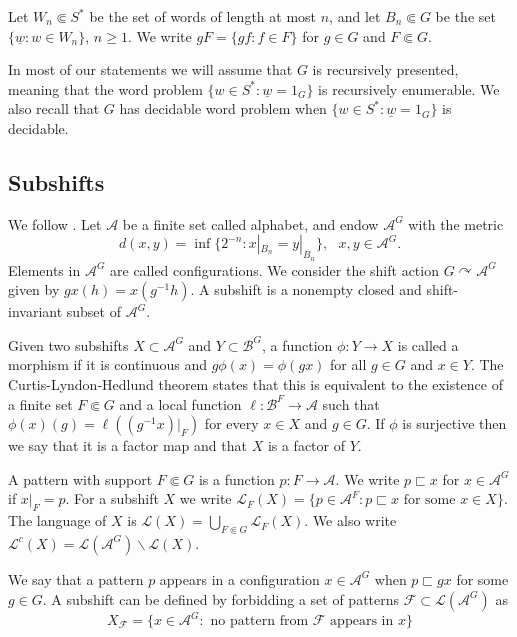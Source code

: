 \documentclass[a4paper,oneside]{amsart}
\renewcommand{\(}{\begin{dmath*}}
\renewcommand{\)}{\end{dmath*}}
\theoremstyle{definition}
\newcommand{\Le}{\mathcal{L}}
\newcommand{\A}{\mathcal{A}}
\newcommand{\B}{\mathcal{B}}
\begin{document}
Let $W_n\Subset S^\ast$ be the set of words of length at most $n$, and let $B_n\Subset G$ be the set $\{\underline{w} : w\in W_n\}$, $n\geq 1$. We write $gF=\{gf : f\in F\}$ for $g\in G$ and $F\Subset G$.

In most of our statements we will assume that $G$ is recursively presented, meaning that the word problem $\{w\in S^\ast : \underline{w}=1_G\}$ is recursively enumerable. We also recall that $G$ has decidable word problem when $\{w\in S^\ast : \underline{w}=1_G\}$ is decidable.  
\subsection{Subshifts}
We follow \cite{ceccherini-silberstein_cellular_2018}. Let $\A$ be a finite set called alphabet, and endow $\A^G$ with the metric
\[d(x,y)=\inf\{2^{-n} : x|_{B_n}=y|_{B_n}\}, \ \ \ x,y\in \A^G.\]
Elements in $\A^G$ are called configurations. We consider the shift action $G\curvearrowright \A^G$ given by $gx(h)=x(g^{-1}h)$. A subshift is a nonempty closed and shift-invariant subset of $\A^G$. 

Given two subshifts $X\subset \A^G$ and $Y\subset \B^G$, a function $\phi\colon Y\to X$ is called a morphism if it is continuous and $g\phi(x)=\phi(gx)$ for all $g\in G$ and $x\in Y$. The Curtis-Lyndon-Hedlund theorem states that this is equivalent to the existence of a finite set $F\Subset G$ and a local function $\ell \colon \B^F\to \A$ such that $\phi(x)(g)=\ell((g^{-1}x)|_F)$ for every $x\in X$ and $g\in G$. If $\phi$ is surjective then we say that it is a factor map and that $X$ is a factor of $Y$.  




A pattern with support $F\Subset G$ is a function $p\colon F\to \A$. We write $p\sqsubset x$ for $x\in \A^G$ if $x|_F=p$.  For a subshift $X$ we write $\Le_F(X)=\{p\in \A^F : p\sqsubset x \text{ for some }x\in X\}$. The language of $X$ is $\Le(X)=\bigcup_{F\Subset G}\Le_F(X)$. We also write $\Le^c(X)=\Le(\A^G)\smallsetminus \Le(X)$.

We say that a pattern $p$ appears in a configuration $x\in\A^G$ when $p\sqsubset gx$ for some $g\in G$. A subshift can be defined by forbidding a set of patterns  $\mathcal F\subset \Le(\A^G)$ as  
 \[X_{\mathcal F}=\{x\in \A^G : \text{ no pattern from $\mathcal F$ appears in $x$}\}\]
\end{document}
